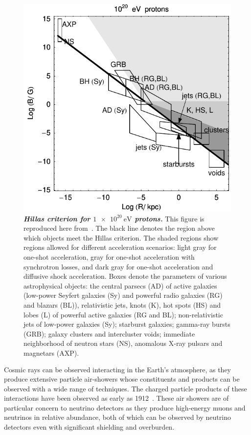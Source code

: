 \begin{figure}
	\centering
	\includegraphics[width=0.5\linewidth]{figures/HillasCriterionProton20}
	\internallinenumbers
	\caption{\textbf{\textit{Hillas criterion for $\SI{1e20}\eV$ protons.}}
		This figure is reproduced here from~\cite{Ptitsyna:2008zs}.
		The black line denotes the region above which objects meet the Hillas criterion.
		The shaded regions show regions allowed for different acceleration scenarios: light gray for one-shot acceleration, gray for one-shot acceleration with synchrotron losses, and dark gray for one-shot acceleration and diffusive shock acceleration.
		Boxes denote the parameters of various astrophysical objects: the central
		parsecs (AD) of active galaxies (low-power Seyfert galaxies (Sy) and powerful radio galaxies (RG) and blazars (BL)), relativistic jets, knots (K), hot spots (HS) and lobes (L) of powerful active galaxies (RG and BL); non-relativistic jets of low-power galaxies (Sy); starburst	galaxies; gamma-ray bursts (GRB); galaxy clusters and intercluster voids; immediate
		neighborhood of neutron stars (NS), anomalous X-ray pulsars and magnetars (AXP).
	}\label{fig:hillasp20}
\end{figure}

Cosmic rays can be observed interacting in the Earth's atmosphere, as they produce extensive particle air-showers whose constituents and products can be observed with a wide range of techniques.
The charged particle products of these interactions have been observed as early as 1912~\cite{hess1912uber}.
These air showers are of particular concern to neutrino detectors as they produce high-energy muons and neutrinos in relative abundance, both of which can be observed by neutrino detectors even with significant shielding and overburden.

